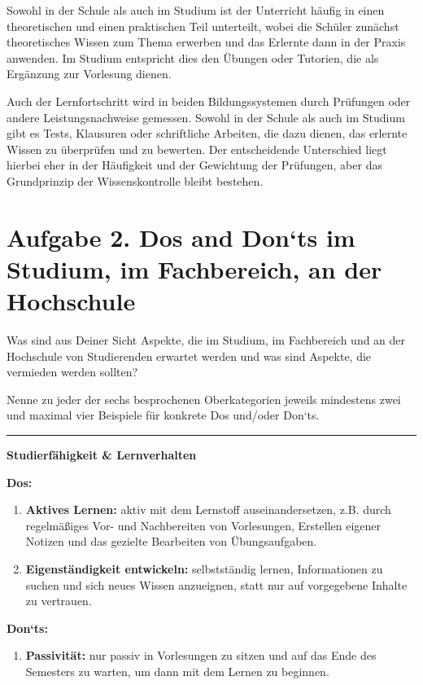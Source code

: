 \documentclass[10pt, oneside]{article}
\begin{document}
Sowohl in der Schule als auch im Studium ist der Unterricht häufig in einen
theoretischen und einen praktischen Teil unterteilt, wobei die Schüler zunächst
theoretisches Wissen zum Thema erwerben und das Erlernte dann in der Praxis
anwenden. Im Studium entspricht dies den Übungen oder Tutorien, die als
Ergänzung zur Vorlesung dienen.

Auch der Lernfortschritt wird in beiden Bildungssystemen durch Prüfungen oder
andere Leistungsnachweise gemessen. Sowohl in der Schule als auch im Studium
gibt es Tests, Klausuren oder schriftliche Arbeiten, die dazu dienen, das
erlernte Wissen zu überprüfen und zu bewerten. Der entscheidende Unterschied
liegt hierbei eher in der Häufigkeit und der Gewichtung der Prüfungen, aber das
Grundprinzip der Wissenskontrolle bleibt bestehen.

\section{Aufgabe 2. Dos and Don`ts im Studium, im Fachbereich, an der Hochschule}

Was sind aus Deiner Sicht Aspekte, die im Studium, im Fachbereich und an der Hochschule von
Studierenden erwartet werden und was sind Aspekte, die vermieden werden sollten?

Nenne zu jeder der sechs besprochenen Oberkategorien jeweils mindestens zwei
und maximal vier Beispiele für konkrete Dos und/oder Don`ts.

\vspace{10pt}
\hrule

\vspace{5pt}
\bgroup
\large\textbf{Studierfähigkeit \& Lernverhalten}
\egroup

\begin{multicols}{2}

\textbf{Dos:}

\begin{enumerate}[-]
    \item \textbf{Aktives Lernen:} aktiv mit dem Lernstoff auseinandersetzen, z.B.
        durch regelmäßiges Vor- und Nachbereiten von Vorlesungen, Erstellen
        eigener Notizen und das gezielte Bearbeiten von Übungsaufgaben.
    \item \textbf{Eigenständigkeit entwickeln:} selbstständig lernen, Informationen zu
        suchen und sich neues Wissen anzueignen, statt nur auf vorgegebene
        Inhalte zu vertrauen.
\end{enumerate}

\columnbreak

\textbf{Don`ts:}

\begin{enumerate}[-]
    \item \textbf{Passivität:} nur passiv in Vorlesungen zu sitzen und auf das Ende des
        Semesters zu warten, um dann mit dem Lernen zu beginnen.
\end{enumerate}

\end{multicols}
\end{document}
